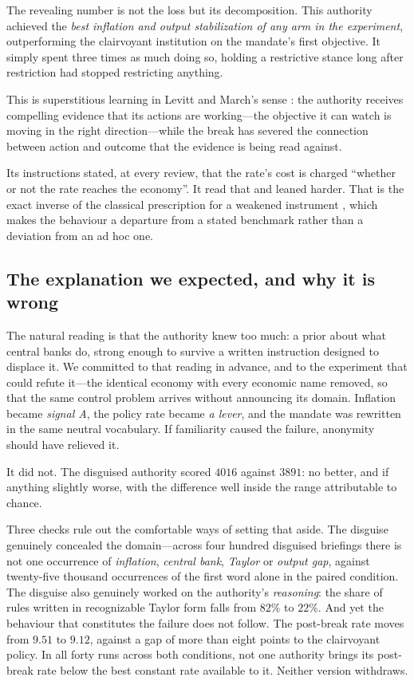 \documentclass[11pt]{article}
\begin{document}
The revealing number is not the loss but its decomposition. This authority achieved the \emph{best
inflation and output stabilization of any arm in the experiment}, outperforming the clairvoyant
institution on the mandate's first objective. It simply spent three times as much doing so, holding a
restrictive stance long after restriction had stopped restricting anything.

This is superstitious learning in Levitt and March's sense \citep{levitt1988organizational}: the
authority receives compelling evidence that its actions are working---the objective it can watch is
moving in the right direction---while the break has severed the connection between action and outcome
that the evidence is being read against.

Its instructions stated, at every review, that the rate's cost is charged ``whether or not the rate
reaches the economy''. It read that and leaned harder. That is the exact inverse of the classical
prescription for a weakened instrument \citep{brainard1967uncertainty}, which makes the behaviour a
departure from a stated benchmark rather than a deviation from an ad hoc one.

\subsection{The explanation we expected, and why it is wrong}

The natural reading is that the authority knew too much: a prior about what central banks do, strong
enough to survive a written instruction designed to displace it. We committed to that reading in
advance, and to the experiment that could refute it---the identical economy with every economic name
removed, so that the same control problem arrives without announcing its domain. Inflation became
\emph{signal A}, the policy rate became \emph{a lever}, and the mandate was rewritten in the same
neutral vocabulary. If familiarity caused the failure, anonymity should have relieved it.

It did not. The disguised authority scored $4016$ against $3891$: no better, and if anything slightly
worse, with the difference well inside the range attributable to chance.

Three checks rule out the comfortable ways of setting that aside. The disguise genuinely concealed
the domain---across four hundred disguised briefings there is not one occurrence of \emph{inflation},
\emph{central bank}, \emph{Taylor} or \emph{output gap}, against twenty-five thousand
occurrences of the first word alone in the paired condition. The disguise also genuinely worked on
the authority's \emph{reasoning}: the share of rules written in recognizable Taylor form falls from
$82\%$ to $22\%$. And yet the behaviour that constitutes the failure does not follow. The post-break
rate moves from $9.51$ to $9.12$, against a gap of more than eight points to the clairvoyant policy.
In all forty runs across both conditions, not one authority brings its post-break rate below the best
constant rate available to it. Neither version withdraws.
\end{document}
